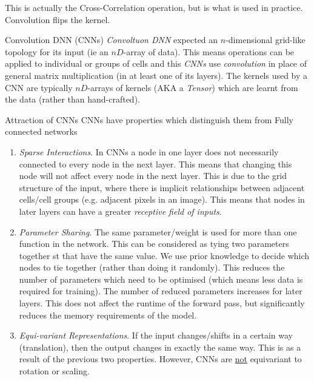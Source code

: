 \documentclass[11pt,a4paper]{article}
\begin{document}
    \begin{remark}{This is actually the Cross-Correlation operation, but is what is used in practice.}
      Convolution flips the kernel.
    \end{remark}

    \begin{definition}{Convolution DNN (CNNs)}
      \textit{Convoltuon DNN} expected an $n$-dimensional grid-like topology for its input (ie an $nD$-array of data). This means operations can be applied to individual or groups of cells and this \textit{CNNs} use \textit{convolution} in place of general matrix multiplication (in at least one of its layers). The kernels used by a CNN are typically $nD$-arrays of kernels (AKA a \textit{Tensor}) which are learnt from the data (rather than hand-crafted).
    \end{definition}

    \begin{remark}{Attraction of CNNs}
      CNNs have properties which distinguish them from Fully connected networks
      \begin{enumerate}
        \item \textit{Sparse Interactions}. In CNNs a node in one layer does not necessarily connected to every node in the next layer. This means that changing this node will not affect every node in the next layer. This is due to the grid structure of the input, where there is implicit relationships between adjacent cells/cell groups (e.g. adjacent pixels in an image). This means that nodes in later layers can have a greater \textit{receptive field of inputs}.
        \item \textit{Parameter Sharing}. The same parameter/weight is used for more than one function in the network. This can be considered as tying two parameters together st that have the same value. We use prior knowledge to decide which nodes to tie together (rather than doing it randomly). This reduces the number of parameters which need to be optimised (which means less data is required for training). The number of reduced parameters increases for later layers. This does not affect the runtime of the forward pass, but significantly reduces the memory requirements of the model.
        \item \textit{Equi-variant Representations}. If the input changes/shifts in a certain way (translation), then the output changes in exactly the same way. This is as a result of the previous two properties. However, CNNs are \underline{not} equivariant to rotation or scaling.
      \end{enumerate}
    \end{remark}
\end{document}
